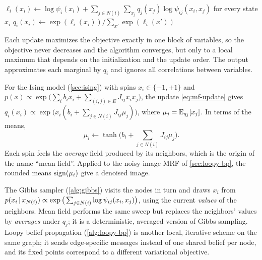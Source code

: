 \begin{algorithm}[H]
\caption{Naive Mean-Field (Coordinate Ascent)}\label{alg:mean-field}
\begin{algorithmic}[1]
\Repeat
   
    \State $\ell_i(x_i)\gets\log\psi_i(x_i)+\sum_{j\in N(i)}\sum_{x_j}q_j(x_j)\log\psi_{ij}(x_i,x_j)$ for every state $x_i$
    \State $q_i(x_i)\gets\exp(\ell_i(x_i))\big/\sum_{x'}\exp(\ell_i(x'))$
  \EndFor
{}
\end{algorithmic}
\end{algorithm}

Each update maximizes the objective exactly in one block of variables, so the objective never decreases and the algorithm converges, but only to a local maximum that depends on the initialization and the update order. The output approximates each marginal by $q_i$ and ignores all correlations between variables.

\begin{remark}\label{rem:mf-ising}
For the Ising model (\cref{sec:ising}) with spins $x_i\in\{-1,+1\}$ and $p(x)\propto\exp\big(\sum_ib_ix_i+\sum_{(i,j)\in E}J_{ij}x_ix_j\big)$, the update \eqref{eq:mf-update} gives $q_i(x_i)\propto\exp\big(x_i(b_i+\sum_{j\in N(i)}J_{ij}\mu_j)\big)$, where $\mu_j=\mathbb{E}_{q_j}[x_j]$. In terms of the means,
\[
\mu_i\gets\tanh\Big(b_i+\sum_{j\in N(i)}J_{ij}\mu_j\Big).
\]
Each spin feels the \emph{average} field produced by its neighbors, which is the origin of the name ``mean field''. Applied to the noisy-image MRF of \cref{sec:loopy-bp}, the rounded means $\operatorname{sign}(\mu_i)$ give a denoised image.
\end{remark}

\begin{remark}\label{rem:mf-gibbs}
The Gibbs sampler (\cref{alg:gibbs}) visits the nodes in turn and draws $x_i$ from $p(x_i\,|\, x_{N(i)})\propto\exp\big(\sum_{j\in N(i)}\log\psi_{ij}(x_i,x_j)\big)$, using the current \emph{values} of the neighbors. Mean field performs the same sweep but replaces the neighbors' values by \emph{averages} under $q_j$; it is a deterministic, averaged version of Gibbs sampling. Loopy belief propagation (\cref{alg:loopy-bp}) is another local, iterative scheme on the same graph; it sends edge-specific messages instead of one shared belief per node, and its fixed points correspond to a different variational objective.
\end{remark}


